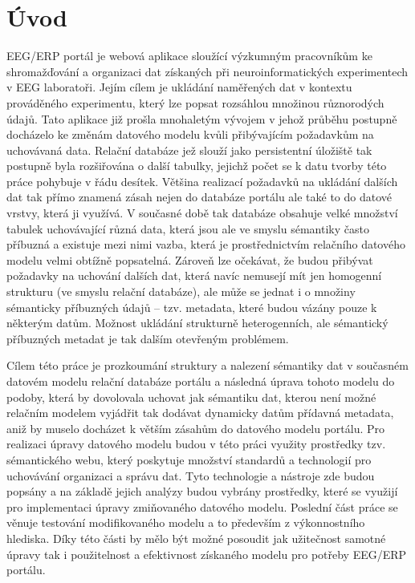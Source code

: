\documentclass{projekt}
\begin{document}
\chapter{Úvod}
\hspace{0.65cm}EEG/ERP portál je webová aplikace sloužící výzkumným pracovníkům ke shromažďování a organizaci dat získaných při neuroinformatických experimentech v EEG laboratoři. Jejím cílem je ukládání naměřených dat v kontextu prováděného experimentu, který lze popsat rozsáhlou množinou různorodých údajů. Tato aplikace již prošla mnohaletým vývojem v jehož průběhu postupně docházelo ke změnám datového modelu kvůli přibývajícím požadavkům na uchovávaná data. Relační databáze jež slouží jako persistentní úložiště tak postupně byla rozšiřována o další tabulky, jejichž počet se k datu tvorby této práce pohybuje v řádu desítek. Většina realizací požadavků na ukládání dalších dat tak přímo znamená zásah nejen do databáze portálu ale také to do datové vrstvy, která ji využívá. V současné době tak databáze obsahuje velké množství tabulek uchovávající různá data, která jsou ale ve smyslu sémantiky často příbuzná a existuje mezi nimi vazba, která je prostřednictvím relačního datového modelu velmi obtížně popsatelná. Zároveň lze očekávat, že budou přibývat požadavky na uchování dalších dat, která navíc nemusejí mít jen homogenní strukturu (ve smyslu relační databáze), ale může se jednat i o množiny sémanticky příbuzných údajů – tzv. metadata, které budou vázány pouze k některým datům. Možnost ukládání strukturně heterogenních, ale sémantický příbuzných metadat je tak dalším otevřeným problémem.

Cílem této práce je prozkoumání struktury a nalezení sémantiky dat v současném datovém modelu relační databáze portálu a následná úprava tohoto modelu do podoby, která by dovolovala uchovat jak sémantiku dat, kterou není možné relačním modelem vyjádřit tak dodávat dynamicky datům přídavná metadata, aniž by muselo docházet k větším zásahům do datového modelu portálu. Pro realizaci úpravy datového modelu budou v této práci využity prostředky tzv. sémantického webu, který poskytuje množství standardů a technologií pro uchovávání organizaci a správu dat. Tyto technologie a nástroje zde budou popsány a na základě jejich analýzy budou vybrány prostředky, které se využijí pro implementaci úpravy zmiňovaného datového modelu. 
Poslední část práce se věnuje testování modifikovaného modelu a to především z výkonnostního hlediska. Díky této části by mělo být možné posoudit jak užitečnost samotné úpravy tak i použitelnost a efektivnost získaného modelu pro potřeby EEG/ERP portálu.
\end{document}
